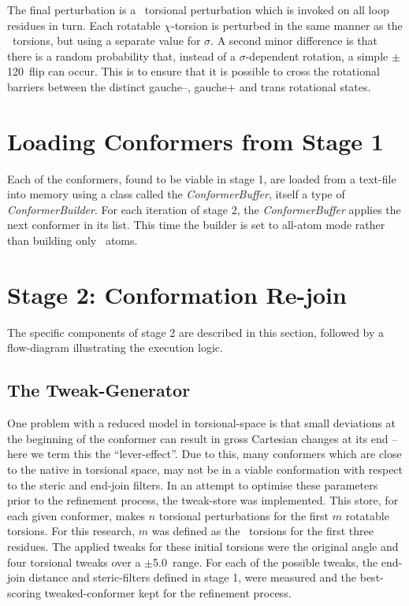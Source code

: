 The final perturbation is a \sidechain\ torsional perturbation which is invoked on all loop residues in turn. Each rotatable $\chi$-torsion is perturbed in the same manner as the \mainchain\ torsions, but using a separate value for $\sigma$. A second minor difference is that there is a random probability that, instead of a $\sigma$-dependent rotation, a simple $\pm$120\degree\ flip can occur. This is to ensure that it is possible to cross the rotational barriers between the distinct gauche--, gauche+ and trans rotational states.



\section{Loading Conformers from Stage 1}

Each of the conformers, found to be viable in stage 1, are loaded from a text-file into memory using a class called the \textsl{ConformerBuffer}, itself a type of \textit{\textsl{ConformerBuilder}}. For each iteration of stage 2, the \textsl{ConformerBuffer} applies the next conformer in its list.
This time the builder is set to all-atom mode rather than building only \mainchain\ atoms.

\section{Stage 2: Conformation Re-join}

The specific components of stage 2 are described in this section, followed by a flow-diagram illustrating the execution logic.

\subsection{The Tweak-Generator}

One problem with a reduced model in torsional-space is that small deviations at the beginning of the conformer can result in gross Cartesian changes at its end -- here we term this the ``lever-effect''. Due to this, many conformers which are close to the native in torsional space, may not be in a viable conformation with respect to the steric and end-join filters. In an attempt to optimise these parameters prior to the refinement process, the tweak-store was implemented.
This store, for each given conformer, makes $n$ torsional perturbations for the first $m$ rotatable torsions. For this research, $m$ was defined as the \phipsi\ torsions for the first three residues. The applied tweaks for these initial torsions were the original angle and four torsional tweaks over a $\pm$5.0\degree\ range.
For each of the possible tweaks, the end-join distance and steric-filters defined in stage 1, were measured and the best-scoring tweaked-conformer kept for the refinement process.




